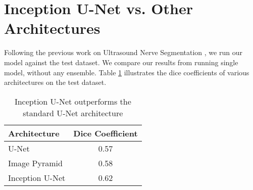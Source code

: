 \section{Inception U-Net vs. Other Architectures}

Following the previous work on Ultrasound Nerve Segmentation \cite{jocicmarko-ultrasound-segmentation}, we run our model against the test dataset. We compare our results from running single model, without any ensemble. Table \ref{tab:arch_compare} illustrates the dice coefficients of various architectures on the test dataset.

\begin{table}[h]
	\centering
	\begin{tabular}{l c}
	\toprule
	Architecture & Dice Coefficient \\
	\midrule
	\midrule
 	U-Net & 0.57 \\
	Image Pyramid & 0.58 \\
	Inception U-Net & 0.62 \\
	\bottomrule
		
	\end{tabular}
	\caption{Inception U-Net outperforms the standard U-Net architecture}
\label{tab:arch_compare}
\end{table}